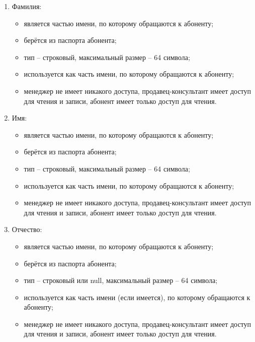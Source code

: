 \begin{enumerate}
\begin{enumerate}
        \item Фамилия:
        \begin{itemize}
            \item является частью имени, по которому обращаются к абоненту;
            \item берётся из паспорта абонента;
            \item тип -- строковый, максимальный размер -- 64 символа;
            \item используется как часть имени, по которому обращаются к абоненту;
            \item менеджер не имеет никакого доступа, продавец-консультант имеет доступ для чтения и записи, абонент имеет только доступ для чтения.
        \end{itemize}

        \item Имя:
        \begin{itemize}
            \item является частью имени, по которому обращаются к абоненту;
            \item берётся из паспорта абонента;
            \item тип -- строковый, максимальный размер -- 64 символа;
            \item используется как часть имени, по которому обращаются к абоненту;
            \item менеджер не имеет никакого доступа, продавец-консультант имеет доступ для чтения и записи, абонент имеет только доступ для чтения.
        \end{itemize}

        \item Отчество:
        \begin{itemize}
            \item является частью имени, по которому обращаются к абоненту;
            \item берётся из паспорта абонента;
            \item тип -- строковый или null, максимальный размер -- 64 символа;
            \item используется как часть имени (если имеется), по которому обращаются к абоненту;
            \item менеджер не имеет никакого доступа, продавец-консультант имеет доступ для чтения и записи, абонент имеет только доступ для чтения.
        \end{itemize}


\end{enumerate}
\end{enumerate}
